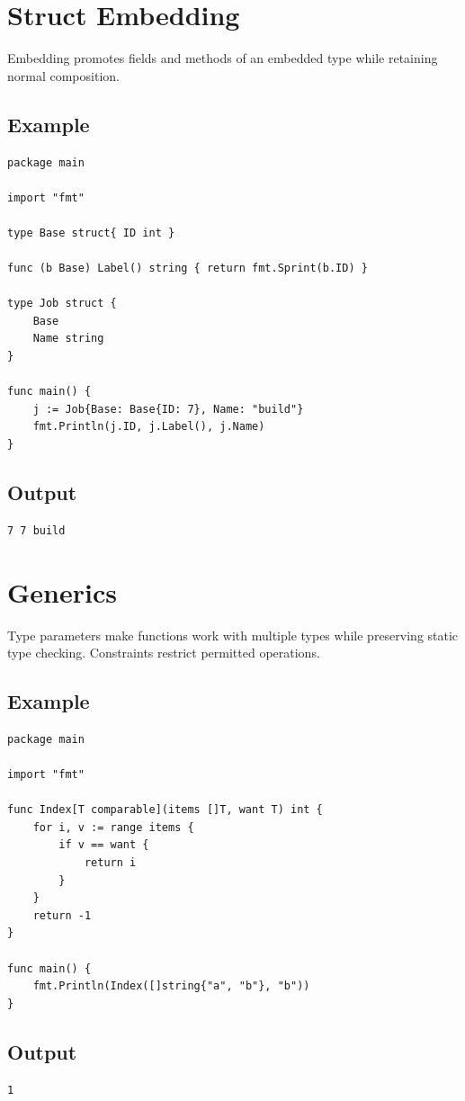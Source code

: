 \documentclass[10pt,oneside]{article}
\newcommand{\sectionline}{\par\vspace{4pt}{\color{rule}\hrule height .5pt}\vspace{7pt}\color{ink}\noindent}
\begin{document}
\section{Struct Embedding}
\sectionline
Embedding promotes fields and methods of an embedded type while retaining normal composition.\par
\subsection*{Example}
\begin{lstlisting}[style=gocode]
package main

import "fmt"

type Base struct{ ID int }

func (b Base) Label() string { return fmt.Sprint(b.ID) }

type Job struct {
	Base
	Name string
}

func main() {
	j := Job{Base: Base{ID: 7}, Name: "build"}
	fmt.Println(j.ID, j.Label(), j.Name)
}
\end{lstlisting}
\subsection*{Output}
\begin{lstlisting}[style=terminal]
7 7 build
\end{lstlisting}
\clearpage
\section{Generics}
\sectionline
Type parameters make functions work with multiple types while preserving static type checking. Constraints restrict permitted operations.\par
\subsection*{Example}
\begin{lstlisting}[style=gocode]
package main

import "fmt"

func Index[T comparable](items []T, want T) int {
	for i, v := range items {
		if v == want {
			return i
		}
	}
	return -1
}

func main() {
	fmt.Println(Index([]string{"a", "b"}, "b"))
}
\end{lstlisting}
\subsection*{Output}
\begin{lstlisting}[style=terminal]
1
\end{lstlisting}
\clearpage
\end{document}
